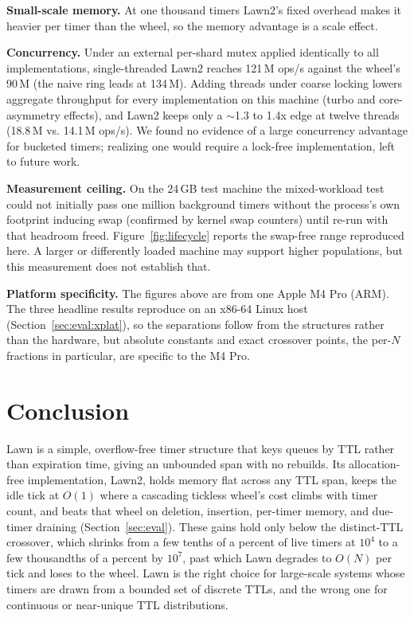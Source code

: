 \documentclass[conference]{IEEEtran}
\begin{document}
\textbf{Small-scale memory.} At one thousand timers Lawn2's fixed overhead makes it heavier per timer than the wheel, so the memory advantage is a scale effect.

\textbf{Concurrency.} Under an external per-shard mutex applied identically to all implementations, single-threaded Lawn2 reaches 121\,M ops/s against the wheel's 90\,M (the naive ring leads at 134\,M). Adding threads under coarse locking lowers aggregate throughput for every implementation on this machine (turbo and core-asymmetry effects), and Lawn2 keeps only a $\sim$1.3 to 1.4x edge at twelve threads (18.8\,M vs. 14.1\,M ops/s). We found no evidence of a large concurrency advantage for bucketed timers; realizing one would require a lock-free implementation, left to future work.

\textbf{Measurement ceiling.} On the 24\,GB test machine the mixed-workload test could not initially pass one million background timers without the process's own footprint inducing swap (confirmed by kernel swap counters) until re-run with that headroom freed. Figure~\ref{fig:lifecycle} reports the swap-free range reproduced here. A larger or differently loaded machine may support higher populations, but this measurement does not establish that.

\textbf{Platform specificity.} The figures above are from one Apple M4 Pro (ARM). The three headline results reproduce on an x86-64 Linux host (Section~\ref{sec:eval:xplat}), so the separations follow from the structures rather than the hardware, but absolute constants and exact crossover points, the per-$N$ fractions in particular, are specific to the M4 Pro.

\section{Conclusion}
Lawn is a simple, overflow-free timer structure that keys queues by TTL rather than expiration time, giving an unbounded span with no rebuilds. Its allocation-free implementation, Lawn2, holds memory flat across any TTL span, keeps the idle tick at $O(1)$ where a cascading tickless wheel's cost climbs with timer count, and beats that wheel on deletion, insertion, per-timer memory, and due-timer draining (Section~\ref{sec:eval}). These gains hold only below the distinct-TTL crossover, which shrinks from a few tenths of a percent of live timers at $10^4$ to a few thousandths of a percent by $10^7$, past which Lawn degrades to $O(N)$ per tick and loses to the wheel. Lawn is the right choice for large-scale systems whose timers are drawn from a bounded set of discrete TTLs, and the wrong one for continuous or near-unique TTL distributions.
\end{document}
